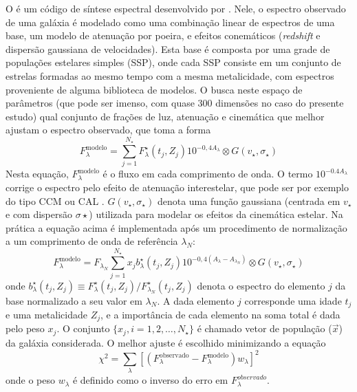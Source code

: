 O \starlight é um código de síntese espectral desenvolvido por
\citet{CidFernandes2005}. Nele, o espectro observado de uma galáxia é modelado
como uma combinação linear de espectros de uma base, um modelo de atenuação por
poeira, e efeitos conemáticos ({\em redshift} e dispersão gaussiana de
velocidades). Esta base é composta por uma grade de populações estelares simples
(SSP), onde cada SSP consiste em um conjunto de estrelas formadas ao mesmo tempo
com a mesma metalicidade, com espectros proveniente de alguma biblioteca de
modelos. O \starlight busca neste espaço de parâmetros (que pode ser imenso, com
quase 300 dimensões no caso do presente estudo) qual conjunto de frações de luz,
atenuação e cinemática que melhor ajustam o espectro observado, que toma a forma
\begin{equation*}
F^{\mathrm{modelo}}_\lambda = \sum_{j=1}^{N_\star} F^\star_\lambda(t_j,Z_j)
10^{ -0,4 A_\lambda}  \otimes G(v_\star,\sigma_\star)
\end{equation*}	
Nesta equação, $F^{\mathrm{modelo}}_\lambda$ é o fluxo em cada comprimento de
onda. O termo $10^{ -0.4 A_\lambda}$ corrige o espectro pelo efeito de atenuação
interestelar, que pode ser por exemplo do tipo CCM \citep*{Cardelli1989} ou
CAL \citep{Calzetti1994}. $G(v_\star,\sigma_\star)$ denota uma função
gaussiana (centrada em $v_\star$ e com dispersão $\sigma\star$) utilizada para
modelar os efeitos da cinemática estelar. Na prática a equação acima é
implementada após um procedimento de normalização a um comprimento de onda de
referência $\lambda_N$:
\begin{equation*}
F^{\mathrm{modelo}}_\lambda = F_{\lambda_N} 
\sum_{j=1}^{N_\star} x_j b^\star_\lambda(t_j,Z_j)
10^{ -0,4 (A_\lambda - A_{\lambda_N}) } \otimes G(v_\star,\sigma_\star)
\end{equation*}
onde $b^\star_\lambda(t_j,Z_j) \equiv  F^\star_\lambda(t_j,Z_j) /
F^\star_{\lambda_N}(t_j,Z_j)$ denota o espectro  do elemento $j$ da base
normalizado a seu valor em $\lambda_N$. A dada elemento $j$ corresponde uma
idade  $t_j$ e uma metalicidade $Z_j$, e a importância de cada elemento na soma
total é dada pelo peso $x_j$. O conjunto $\{x_j, i=1,2,\ldots,N_\star\}$ é
chamado vetor de população ($\vec{x}$) da galáxia considerada.
O melhor ajuste é escolhido minimizando a equação
\begin{equation*}
\chi^2 = \sum_\lambda \left[(F^{\mathrm{observado}}_\lambda -
F^{\mathrm{modelo}}_\lambda) w_\lambda\right]^2
\end{equation*}
onde o peso $w_\lambda$ é definido como o inverso do erro em
$F_\lambda^{observado}$. 

